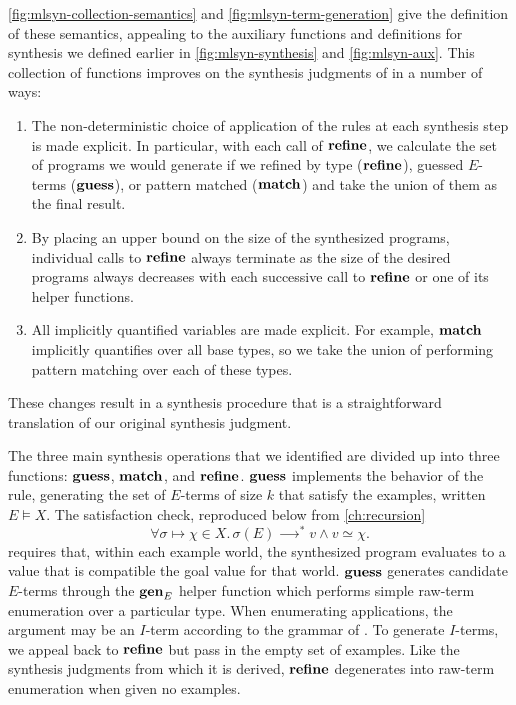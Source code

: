 \autoref{fig:mlsyn-collection-semantics} and \autoref{fig:mlsyn-term-generation} give the definition of these semantics, appealing to the auxiliary functions and definitions for synthesis we defined earlier in \autoref{fig:mlsyn-synthesis} and \autoref{fig:mlsyn-aux}.
This collection of functions improves on the synthesis judgments of \mlsyn{} in a number of ways:
\begin{enumerate}
  \item The non-deterministic choice of application of the rules at each synthesis step is made explicit.
    In particular, with each call of $\mathbf{refine}$, we calculate the set of programs we would generate if we refined by type ($\mathbf{refine}$), guessed $E$-terms ($\mathbf{guess}$), or pattern matched ($\mathbf{match}$) and take the union of them as the final result.
  \item By placing an upper bound on the size of the synthesized programs, individual calls to $\mathbf{refine}$ always terminate as the size of the desired programs always decreases with each successive call to $\mathbf{refine}$ or one of its helper functions.
  \item All implicitly quantified variables are made explicit.
    For example, $\mathbf{match}$ implicitly quantifies over all base types, so we take the union of performing pattern matching over each of these types.
\end{enumerate}
These changes result in a synthesis procedure that is a straightforward translation of our original synthesis judgment.

The three main synthesis operations that we identified are divided up into three functions: $\mathbf{guess}$, $\mathbf{match}$, and $\mathbf{refine}$.
$\mathbf{guess}$ implements the behavior of the  rule, generating the set of $E$-terms of size $k$ that satisfy the examples, written $E ⊨ Χ$.
The satisfaction check, reproduced below from \autoref{ch:recursion}
\[
  ∀σ ↦ χ ∈ Χ.\, σ(E) ⟶^* v ∧ v ≃ χ.
\]
requires that, within each example world, the synthesized program evaluates to a value that is compatible the goal value for that world.
$\mathbf{guess}$ generates candidate $E$-terms through the $\mathbf{gen}_E$ helper function which performs simple raw-term enumeration over a particular type.
When enumerating applications, the argument may be an $I$-term according to the grammar of \mlsyn{}.
To generate $I$-terms, we appeal back to $\mathbf{refine}$ but pass in the empty set of examples.
Like the synthesis judgments from which it is derived, $\mathbf{refine}$ degenerates into raw-term enumeration when given no examples.

